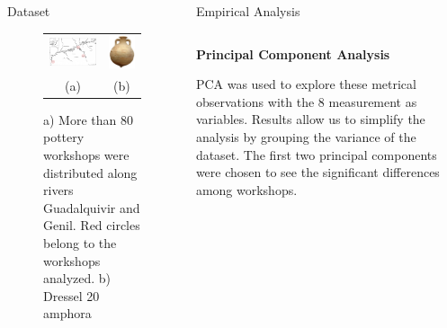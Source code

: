 \documentclass[final]{beamer}
\newlength{\onecolwid}
\newlength{\twocolwid}
\begin{document}
\begin{frame}[t]
\begin{columns}[t]
\begin{column}{\onecolwid}
\begin{block}{Dataset}
\begin{figure}
\begin{tabular}{cc}


\includegraphics[width=0.7\linewidth]{images/fig1.png} &
\includegraphics[width=0.2\linewidth]{images/amphorae.png} \\
(a) & (b)
\end{tabular}

\singlespace
\caption{a) More than 80 pottery workshops were distributed along rivers Guadalquivir and Genil. Red circles belong to the workshops analyzed. b) Dressel 20 amphora}
\label{fig:betica}
\end{figure}


 \end{block}
\end{column} %

\begin{column}{\twocolwid}


\begin{block}{Empirical Analysis}

\begin{columns}[t,totalwidth=\twocolwid]
\begin{column}{\onecolwid} %


{\textbf{Principal Component Analysis}} 
\justify

PCA was used to explore these metrical observations with the 8 measurement as variables. Results allow us to simplify the analysis by grouping the variance of the dataset. The first two principal components were chosen to see the significant differences among workshops. 


\end{column}
\end{columns}
\end{block}
\end{column}
\end{columns}
\end{frame}
\end{document}
